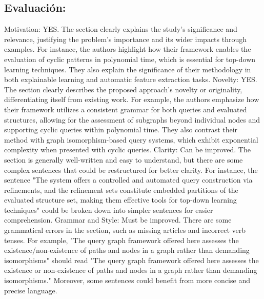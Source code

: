 \documentclass{article}%
\begin{document}
\subsection{Evaluación:}%
\label{subsec:Evaluacin}%
\newline%
Motivation:\newline%
YES. The section clearly explains the study's significance and relevance, justifying the problem's importance and its wider impacts through examples. For instance, the authors highlight how their framework enables the evaluation of cyclic patterns in polynomial time, which is essential for top{-}down learning techniques. They also explain the significance of their methodology in both explainable learning and automatic feature extraction tasks.\newline%
\newline%
Novelty:\newline%
YES. The section clearly describes the proposed approach's novelty or originality, differentiating itself from existing work. For example, the authors emphasize how their framework utilizes a consistent grammar for both queries and evaluated structures, allowing for the assessment of subgraphs beyond individual nodes and supporting cyclic queries within polynomial time. They also contrast their method with graph isomorphism{-}based query systems, which exhibit exponential complexity when presented with cyclic queries.\newline%
\newline%
Clarity:\newline%
Can be improved. The section is generally well{-}written and easy to understand, but there are some complex sentences that could be restructured for better clarity. For instance, the sentence "The system offers a controlled and automated query construction via refinements, and the refinement sets constitute embedded partitions of the evaluated structure set, making them effective tools for top{-}down learning techniques" could be broken down into simpler sentences for easier comprehension.\newline%
\newline%
Grammar and Style:\newline%
Must be improved. There are some grammatical errors in the section, such as missing articles and incorrect verb tenses. For example, "The query graph framework offered here assesses the existence/non{-}existence of paths and nodes in a graph rather than demanding isomorphisms" should read "The query graph framework offered here assesses the existence or non{-}existence of paths and nodes in a graph rather than demanding isomorphisms." Moreover, some sentences could benefit from more concise and precise language.\newline%
\end{document}
